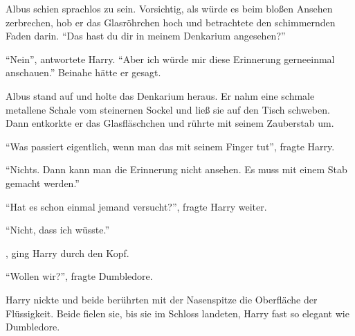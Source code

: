 Albus schien sprachlos zu sein. Vorsichtig, als würde es beim bloßen Ansehen zerbrechen, hob er das Glasröhrchen hoch und betrachtete den schimmernden Faden darin. \enquote{Das hast du dir in meinem Denkarium angesehen?}

\enquote{Nein}, antwortete Harry. \enquote{Aber ich würde mir diese Erinnerung gerne\abs einmal anschauen.} Beinahe hätte er  gesagt.

Albus stand auf und holte das Denkarium heraus. Er nahm eine schmale metallene Schale vom steinernen Sockel und ließ sie auf den Tisch schweben. Dann entkorkte er das Glasfläschchen und rührte mit seinem Zauberstab um.

\enquote{Was passiert eigentlich, wenn man das mit seinem Finger tut}, fragte Harry.

\enquote{Nichts. Dann kann man die Erinnerung nicht ansehen. Es muss mit einem Stab gemacht werden.}

\enquote{Hat es schon einmal jemand versucht?}, fragte Harry weiter.

\enquote{Nicht, dass ich wüsste.}

, ging Harry durch den Kopf.

\enquote{Wollen wir?}, fragte Dumbledore.

Harry nickte und beide berührten mit der Nasenspitze die Oberfläche der Flüssigkeit. Beide fielen sie, bis sie im Schloss landeten, Harry fast so elegant wie Dumbledore.

